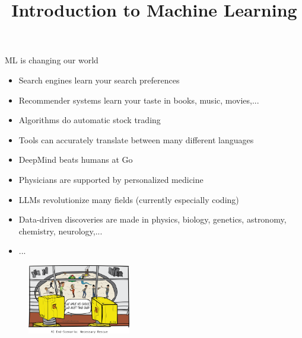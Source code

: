 \documentclass[11pt,compress,t,notes=noshow, xcolor=table]{beamer}
\title{Introduction to Machine Learning}
\begin{document}


\begin{frame}{ML is changing our world}

\begin{itemize}

  \item Search engines learn your search preferences
  
  \item Recommender systems learn your taste in books, music, movies,...
  
  \item Algorithms do automatic stock trading
 

  \item Tools can accurately translate between many different languages
    
  \item DeepMind beats humans at Go
  
  \item Physicians are supported by personalized medicine

  \item LLMs revolutionize many fields (currently especially coding)
  
  \item Data-driven discoveries are made in physics, biology, genetics, 
  astronomy, chemistry, neurology,...
  
  \item ...
  
\end{itemize}

  \begin{figure}
    \includegraphics[width=0.4\textwidth]{figure_man/ai_world_end} 
  \end{figure}


\end{frame}
\end{document}
